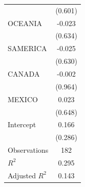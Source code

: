 {\begin{tabular}{l*{1}{c}}
                    &     (0.601)   \\
OCEANIA             &      -0.023   \\
                    &     (0.634)   \\
SAMERICA            &      -0.025   \\
                    &     (0.630)   \\
CANADA              &      -0.002   \\
                    &     (0.964)   \\
MEXICO              &       0.023   \\
                    &     (0.648)   \\
Intercept           &       0.166   \\
                    &     (0.286)   \\
\hline
Observations        &         182   \\
\(R^{2}\)           &       0.295   \\
Adjusted \(R^{2}\)  &       0.143   \\
\hline\hline
\end{tabular}
}
